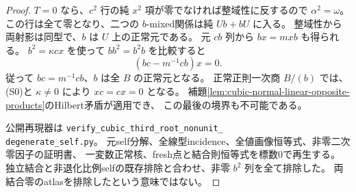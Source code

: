 \begin{proof}
$T=0$ なら、$c^2$ 行の純 $x^2$ 項が零でなければ整域性に反するので $\alpha^2=\omega$。
この行は全て零となり、二つの $b$-mixed関係は純 $Ub+bU$ に入る。
整域性から両射影は同型で、$b$ は $U$ 上の正常元である。
元 $cb$ 列から $bx=mxb$ も得られる。
$b^2=\kappa cx$ を使って $bb^2=b^2b$ を比較すると
\[
 (bc-m^{-1}cb)x=0.
\]
従って $bc=m^{-1}cb$、$b$ は全 $B$ の正常元となる。
正常正則一次商 $B/(b)$ では、(S0)と $\kappa\ne0$ により $xc=cx=0$ となる。
補題\ref{lem:cubic-normal-linear-opposite-products}のHilbert矛盾が適用でき、
この最後の境界も不可能である。

公開再現器は \texttt{verify\_cubic\_third\_root\_nonunit\_}\\
\texttt{degenerate\_self.py}。
元self分解、全線型incidence、全値画像恒等式、非零二次零因子の証明書、
一変数正常核、fresh点と結合則恒等式を標数0で再生する。
独立結合と非退化比例selfの既存排除と合わせ、非零 $b^2$ 列を全て排除した。
両結合零のatlasを排除したという意味ではない。
\end{proof}
